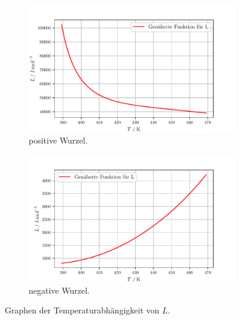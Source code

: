 \begin{figure}[htbp]
  \begin{subfigure}{\textwidth}
  \centering
  \includegraphics[scale=0.7]{build/plot3.pdf}
  \caption{positive Wurzel.}
  \label{fig:plot3}
\end{subfigure}
\begin{subfigure}{\textwidth}
  \centering
  \includegraphics[scale=0.7]{build/plot4.pdf}
  \caption{negative Wurzel.}
  \label{fig:plot4}
\end{subfigure}
\caption{Graphen der Temperaturabhängigkeit von $L$.}
\end{figure}

